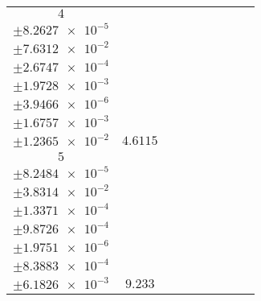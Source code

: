 \documentclass[8pt]{article}
\begin{document}
\begin{longtable}[l]{c c c c c c c c c}
$\num{4}$ & \begin{tabular}[c]{@{}c@{}}$\num{6.2241e-2}$ \\ $\pm\num{8.2627e-5}$\end{tabular} & \begin{tabular}[c]{@{}c@{}}$\num{0.13222}$ \\ $\pm\num{7.6312e-2}$\end{tabular} & \begin{tabular}[c]{@{}c@{}}$\num{12.903}$ \\ $\pm\num{2.6747e-4}$\end{tabular} & \begin{tabular}[c]{@{}c@{}}$\num{1.3472e+3}$ \\ $\pm\num{1.9728e-3}$\end{tabular} & \begin{tabular}[c]{@{}c@{}}$\num{2.6951}$ \\ $\pm\num{3.9466e-6}$\end{tabular} & \begin{tabular}[c]{@{}c@{}}$\num{1.1786}$ \\ $\pm\num{1.6757e-3}$\end{tabular} & \begin{tabular}[c]{@{}c@{}}$\num{4.2799}$ \\ $\pm\num{1.2365e-2}$\end{tabular} & $\num{4.6115}$\\
$\num{5}$ & \begin{tabular}[c]{@{}c@{}}$\num{0.12371}$ \\ $\pm\num{8.2484e-5}$\end{tabular} & \begin{tabular}[c]{@{}c@{}}$\num{-0.21115}$ \\ $\pm\num{3.8314e-2}$\end{tabular} & \begin{tabular}[c]{@{}c@{}}$\num{-7.399}$ \\ $\pm\num{1.3371e-4}$\end{tabular} & \begin{tabular}[c]{@{}c@{}}$\num{1.3646e+3}$ \\ $\pm\num{9.8726e-4}$\end{tabular} & \begin{tabular}[c]{@{}c@{}}$\num{2.73}$ \\ $\pm\num{1.9751e-6}$\end{tabular} & \begin{tabular}[c]{@{}c@{}}$\num{1.1775}$ \\ $\pm\num{8.3883e-4}$\end{tabular} & \begin{tabular}[c]{@{}c@{}}$\num{4.2132}$ \\ $\pm\num{6.1826e-3}$\end{tabular} & $\num{9.233}$\\

\end{longtable}
\end{document}
